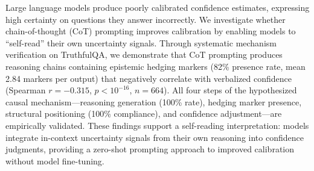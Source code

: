 Large language models produce poorly calibrated confidence estimates, expressing high certainty on questions they answer incorrectly. We investigate whether chain-of-thought (CoT) prompting improves calibration by enabling models to ``self-read'' their own uncertainty signals. Through systematic mechanism verification on TruthfulQA, we demonstrate that CoT prompting produces reasoning chains containing epistemic hedging markers (82\% presence rate, mean 2.84 markers per output) that negatively correlate with verbalized confidence (Spearman $r=-0.315$, $p<10^{-16}$, $n=664$). All four steps of the hypothesized causal mechanism---reasoning generation (100\% rate), hedging marker presence, structural positioning (100\% compliance), and confidence adjustment---are empirically validated. These findings support a self-reading interpretation: models integrate in-context uncertainty signals from their own reasoning into confidence judgments, providing a zero-shot prompting approach to improved calibration without model fine-tuning.

